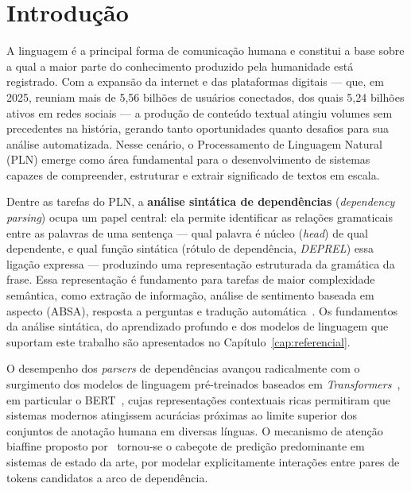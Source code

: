 
\chapter{Introdução}
\label{cap:introducao}

A linguagem é a principal forma de comunicação humana e constitui a base sobre a qual a maior
parte do conhecimento produzido pela humanidade está registrado. Com a expansão da internet e
das plataformas digitais — que, em 2025, reuniam mais de 5,56 bilhões de usuários conectados,
dos quais 5,24 bilhões ativos em redes sociais — a produção de conteúdo textual atingiu volumes
sem precedentes na história, gerando tanto oportunidades quanto desafios para sua análise
automatizada. Nesse cenário, o Processamento de Linguagem Natural (PLN) emerge como área
fundamental para o desenvolvimento de sistemas capazes de compreender, estruturar e extrair
significado de textos em escala.

Dentre as tarefas do PLN, a \textbf{análise sintática de dependências} (\textit{dependency
parsing}) ocupa um papel central: ela permite identificar as relações gramaticais entre as
palavras de uma sentença — qual palavra é núcleo (\textit{head}) de qual dependente, e qual
função sintática (rótulo de dependência, \textit{DEPREL}) essa ligação expressa — produzindo
uma representação estruturada da gramática da frase. Essa representação é fundamento para
tarefas de maior complexidade semântica, como extração de informação, análise de sentimento
baseada em aspecto (ABSA), resposta a perguntas e tradução automática~\citep{jurafsky2023speech}.
Os fundamentos da análise sintática, do aprendizado profundo e dos modelos de linguagem que
suportam este trabalho são apresentados no Capítulo~\ref{cap:referencial}.

O desempenho dos \textit{parsers} de dependências avançou radicalmente com o surgimento dos
modelos de linguagem pré-treinados baseados em \textit{Transformers}~\citep{vaswani2017attention},
em particular o BERT~\citep{devlin2019bert}, cujas representações contextuais ricas permitiram
que sistemas modernos atingissem acurácias próximas ao limite superior dos conjuntos de anotação
humana em diversas línguas. O mecanismo de atenção biaffine proposto por~\citet{dozat2016deep}
tornou-se o cabeçote de predição predominante em sistemas de estado da arte, por modelar
explicitamente interações entre pares de tokens candidatos a arco de dependência.

